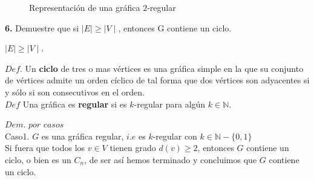 \documentclass[12pt]{article}
\begin{document}
\begin{figure}[h!]
    \centering
    \begin{minipage}{0.6\textwidth}
        \centering
        \caption{Representación de una gráfica $2$-regular}
    \end{minipage}
\end{figure}

%
%
\textbf{6.} Demuestre que si $\mid E \mid \geq\mid V \mid$, entonces G contiene un ciclo.

\begin{tcolorbox}[title=\textbf{Hipotesis}, colback=red!15!white, colframe=black!, breakable]
    $\mid E \mid \geq \mid V \mid$.
\end{tcolorbox}

\begin{tcolorbox}[title=\textbf{Definiciones}, colback=blue!15!white, colframe=black!]
    $Def$. Un \textbf{ciclo} de tres o mas vértices es una gráfica simple en la que su conjunto de
    vértices admite un orden cíclico de tal forma que dos vértices son adyacentes si y sólo si son consecutivos en el orden.\\

    $Def$ Una gráfica es \textbf{regular} si es $k$-regular para algún $k \in \mathbb{N}$.
\end{tcolorbox}

$Dem.$ $por$ $casos$\\

Caso1. $G$ es una gráfica regular, $i.e$ es $k$-regular con $k \in \mathbb{N} - \{0,1\}$\\

Si fuera que todos los $v \in V$ tienen grado $d(v) \geq 2$, entonces $G$ contiene un ciclo, o bien es un $C_n$, de ser así hemos terminado
y concluimos que $G$ contiene un ciclo.\\
\end{document}

